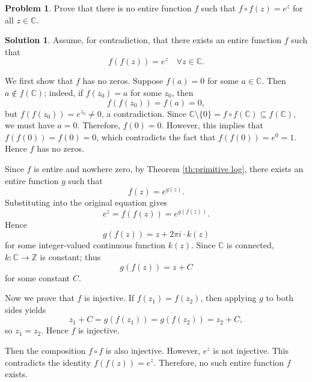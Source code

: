 \documentclass{article}
\theoremstyle{definition}
\newtheorem{problem}{Problem}
\newtheorem{solution}{Solution}
\newcommand{\C}{\mathbb{C}}
\newcommand{\Z}{\mathbb{Z}}
\begin{document}
\begin{problem}
    Prove that there is no entire function $f$ such that $f\circ f(z)=e^z$ for all $z\in\C$.
\end{problem}
\begin{solution}
    Assume, for contradiction, that there exists an entire function $f$ such that
\[
f(f(z))=e^z \quad \forall z\in\mathbb C.
\]

We first show that $f$ has no zeros. Suppose $f(a)=0$ for some $a\in\mathbb C$. Then $a\notin f(\mathbb C)$; indeed, if $f(z_0)=a$ for some $z_0$, then
\[
f(f(z_0))=f(a)=0,
\]
but $f(f(z_0))=e^{z_0}\neq 0$, a contradiction.
Since $\C\setminus\{0\}=f\circ f(\C)\subseteq f(\C)$, we must have $a=0$. Therefore, $f(0)=0$. However, this implies that $f(f(0))=f(0)=0$, which contradicts the fact that $f(f(0))=e^0=1$. Hence $f$ has no zeros.

Since $f$ is entire and nowhere zero, by Theorem \ref{th:primitive log}, there exists an entire function $g$ such that
\[
f(z)=e^{g(z)}.
\]
Substituting into the original equation gives
\[
e^z=f(f(z))=e^{g(f(z))}.
\]
Hence
\[
g(f(z))=z+2\pi i\cdot  k(z)
\]
for some integer-valued continuous function $k(z)$. Since $\mathbb C$ is connected, $k\colon \C\to \Z$ is constant; thus
\[
g(f(z))=z+C
\]
for some constant $C$.

Now we prove that $f$ is injective. If $f(z_1)=f(z_2)$, then applying $g$ to both sides yields
\[
z_1+C=g(f(z_1))=g(f(z_2))=z_2+C,
\]
so $z_1=z_2$. Hence $f$ is injective.

Then the composition $f\circ f$ is also injective. However, $e^z$ is not injective. This contradicts the identity $f(f(z))=e^z$. Therefore, no such entire function $f$ exists. \qedsymbol
\end{solution}
\end{document}
